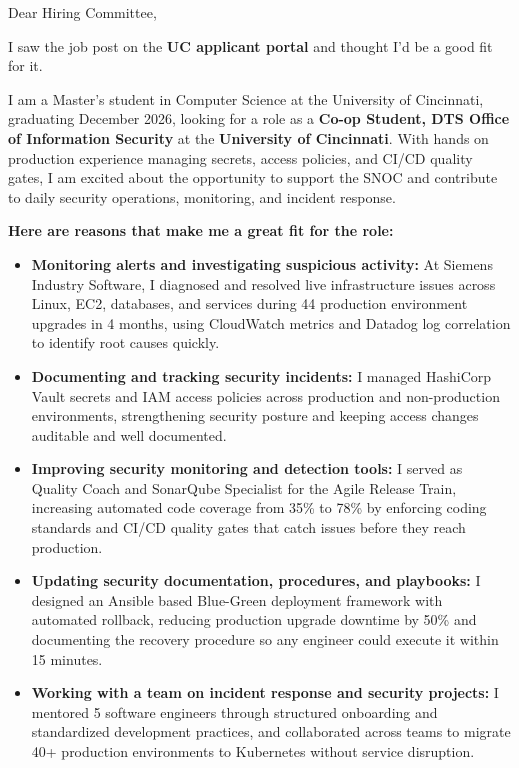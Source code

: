 \documentclass[11pt]{letter}
\date{}
\begin{document}
\begin{letter}{}

\opening{Dear Hiring Committee,}

I saw the job post on the \textbf{UC applicant portal} and thought I'd be a good fit for it.

I am a Master's student in Computer Science at the University of Cincinnati, graduating December 2026, looking for a role as a \textbf{Co-op Student, DTS Office of Information Security} at the \textbf{University of Cincinnati}. With hands on production experience managing secrets, access policies, and CI/CD quality gates, I am excited about the opportunity to support the SNOC and contribute to daily security operations, monitoring, and incident response.

\textbf{Here are reasons that make me a great fit for the role:}

\begin{itemize}[leftmargin=*, itemsep=0.45em]
    \item \textbf{Monitoring alerts and investigating suspicious activity:} At Siemens Industry Software, I diagnosed and resolved live infrastructure issues across Linux, EC2, databases, and services during 44 production environment upgrades in 4 months, using CloudWatch metrics and Datadog log correlation to identify root causes quickly.

    \item \textbf{Documenting and tracking security incidents:} I managed HashiCorp Vault secrets and IAM access policies across production and non-production environments, strengthening security posture and keeping access changes auditable and well documented.

    \item \textbf{Improving security monitoring and detection tools:} I served as Quality Coach and SonarQube Specialist for the Agile Release Train, increasing automated code coverage from 35\% to 78\% by enforcing coding standards and CI/CD quality gates that catch issues before they reach production.

    \item \textbf{Updating security documentation, procedures, and playbooks:} I designed an Ansible based Blue-Green deployment framework with automated rollback, reducing production upgrade downtime by 50\% and documenting the recovery procedure so any engineer could execute it within 15 minutes.

    \item \textbf{Working with a team on incident response and security projects:} I mentored 5 software engineers through structured onboarding and standardized development practices, and collaborated across teams to migrate 40+ production environments to Kubernetes without service disruption.
\end{itemize}


\end{letter}
\end{document}
